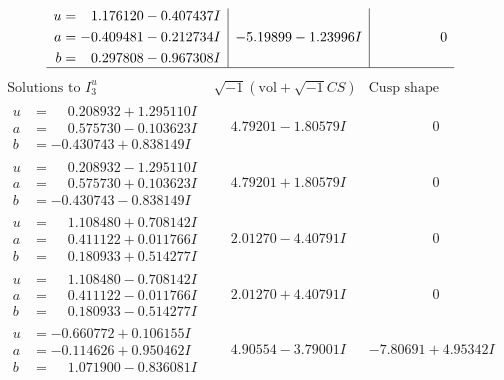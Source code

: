 \documentclass[1p]{elsarticle_modified}
\theoremstyle{definition}
\newcommand{\I}{\sqrt{-1}}
\begin{document}
$$\begin{array}{c|c|c}
\begin{aligned}
u &= \phantom{-}1.176120 - 0.407437 I \\
a &= -0.409481 - 0.212734 I \\
b &= \phantom{-}0.297808 - 0.967308 I\end{aligned}
 & -5.19899 - 1.23996 I & \phantom{-0.000000 } 0\\
 \hline 
 \end{array}$$\newpage$$\begin{array}{c|c|c}  
\text{Solutions to }I^u_{3}& \I (\text{vol} + \sqrt{-1}CS) & \text{Cusp shape}\\
 \hline 
\begin{aligned}
u &= \phantom{-}0.208932 + 1.295110 I \\
a &= \phantom{-}0.575730 - 0.103623 I \\
b &= -0.430743 + 0.838149 I\end{aligned}
 & \phantom{-}4.79201 - 1.80579 I & \phantom{-0.000000 } 0 \\ \hline\begin{aligned}
u &= \phantom{-}0.208932 - 1.295110 I \\
a &= \phantom{-}0.575730 + 0.103623 I \\
b &= -0.430743 - 0.838149 I\end{aligned}
 & \phantom{-}4.79201 + 1.80579 I & \phantom{-0.000000 } 0 \\ \hline\begin{aligned}
u &= \phantom{-}1.108480 + 0.708142 I \\
a &= \phantom{-}0.411122 + 0.011766 I \\
b &= \phantom{-}0.180933 + 0.514277 I\end{aligned}
 & \phantom{-}2.01270 - 4.40791 I & \phantom{-0.000000 } 0 \\ \hline\begin{aligned}
u &= \phantom{-}1.108480 - 0.708142 I \\
a &= \phantom{-}0.411122 - 0.011766 I \\
b &= \phantom{-}0.180933 - 0.514277 I\end{aligned}
 & \phantom{-}2.01270 + 4.40791 I & \phantom{-0.000000 } 0 \\ \hline\begin{aligned}
u &= -0.660772 + 0.106155 I \\
a &= -0.114626 + 0.950462 I \\
b &= \phantom{-}1.071900 - 0.836081 I\end{aligned}
 & \phantom{-}4.90554 - 3.79001 I & -7.80691 + 4.95342 I \\ \hline\begin{aligned}

\end{aligned}
\end{array}$$
\end{document}
